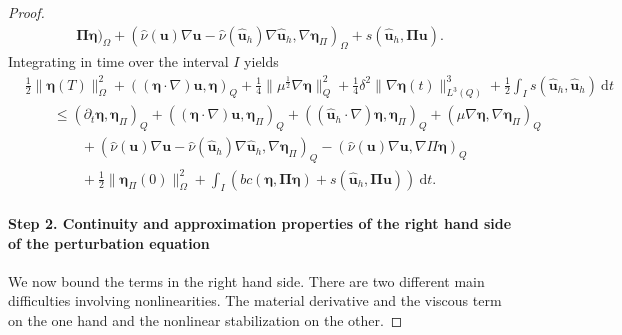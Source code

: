 \documentclass[10pt]{amsart}
\numberwithin{equation}{section}
\theoremstyle{definition}
\theoremstyle{remark}
\renewcommand{\(}{\bigl(}
\renewcommand{\)}{\bigr)}
\newcommand{\bld}[1]{\boldsymbol{#1}}
\newcommand{\bu}{\bld{u}}
\newcommand{\bhu}{\hat{\bld{u}}}
\newcommand{\bldeta}{\bld{\eta}}
\newcommand{\bPi}{\bld{\Pi}}
\begin{document}
\begin{proof}
\begin{align*}
\bPi \bldeta)_\Omega+ (\hat \nu(\bu) \nabla \bu - \hat \nu(\bhu_h) \nabla \bhu_h, \nabla
\bldeta_\Pi)_\Omega + s(\bhu_h,\bPi \bu)
.
\end{align*}
Integrating in time over the interval $I$ yields
\begin{align}\label{eq:1st_bound}
&\frac12\|\bldeta(T)\|_\Omega^2 + ((\bldeta \cdot \nabla)
\bu,\bldeta)_Q+ \frac14 \|\mu^{\frac12} \nabla \bldeta \|_Q^2 +\frac14 \delta^2
\|\nabla \bldeta(t)\|_{L^3(Q)}^3 + \frac12\int_I s(\bhu_h,\bhu_h) ~\mbox{d}t
\\ \nonumber
&\qquad \leq (\partial_t \bldeta, \bldeta_\Pi)_Q + ((\bldeta \cdot \nabla)
\bu,\bldeta_\Pi)_Q 
+ ((\bhu_h \cdot \nabla) \bldeta,\bldeta_\Pi)_Q + (\mu \nabla \bldeta, \nabla \bldeta_\Pi)_Q
\\ \nonumber
&\qquad \qquad + (\hat \nu(\bu) \nabla \bu - \hat \nu(\bhu_h)
\nabla \bhu_h, \nabla \bldeta_\Pi)_Q - (\hat \nu(\bu) \nabla \bu, \nabla
\Pi \bldeta)_Q  
\\ \nonumber
&\qquad \qquad 
+ \frac12\|\bldeta_{\Pi}(0)\|_\Omega^2 +  \int_I (bc(\bldeta,\bPi \bldeta)+ s(\bhu_h,\bPi \bu)) ~\mbox{d}t.
\end{align}
\paragraph{\bf{Step 2. Continuity and approximation properties of the right hand side of
  the perturbation equation}}
We now bound the terms in the right hand side. There are two different
main difficulties involving nonlinearities. The material derivative and the viscous term on
the one hand and the nonlinear stabilization on the other.


\end{proof}
\end{document}
